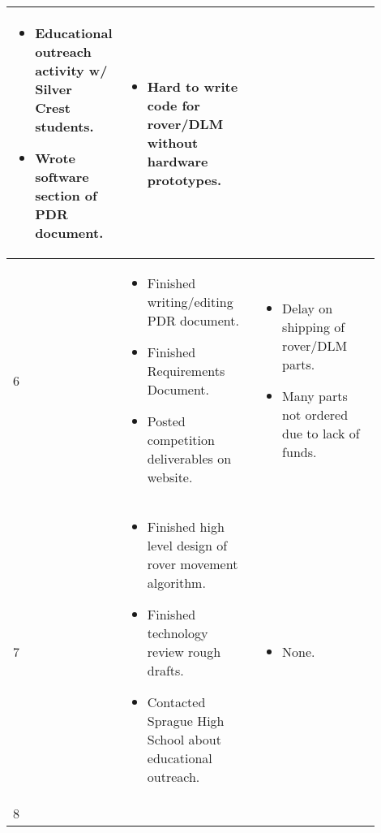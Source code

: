 \documentclass[onecolumn, draftclsnofoot,10pt, compsoc]{IEEEtran}
\newenvironment{myitemize}
{ \begin{itemize}
    \setlength{\itemsep}{0pt}
    \setlength{\parskip}{0pt}
    \setlength{\parsep}{0pt}     }
{ \end{itemize}                  }
\begin{document}
\begin{singlespacing}
\begin{tabular} {l p{0.45\linewidth} p{0.45\linewidth}}
\begin{myitemize}
\item Educational outreach activity w/ Silver Crest students.
\item Wrote software section of PDR document.
\vspace{-\baselineskip}\end{myitemize} & 
\vspace{-\baselineskip}\begin{myitemize}
\item Hard to write code for rover/DLM without hardware prototypes.
\vspace{-\baselineskip}\end{myitemize} \\\hline
6 &
\vspace{-\baselineskip}\begin{myitemize}
\item Finished writing/editing PDR document.
\item Finished Requirements Document.
\item Posted competition deliverables on website.
\vspace{-\baselineskip}\end{myitemize} & 
\vspace{-\baselineskip}\begin{myitemize}
\item Delay on shipping of rover/DLM parts.
\item Many parts not ordered due to lack of funds.
\vspace{-\baselineskip}\end{myitemize} \\\hline
7 &
\vspace{-\baselineskip}\begin{myitemize}
\item Finished high level design of rover movement algorithm.
\item Finished technology review rough drafts.
\item Contacted Sprague High School about educational outreach.
\vspace{-\baselineskip}\end{myitemize} & 
\vspace{-\baselineskip}\begin{myitemize}
\item None.
\vspace{-\baselineskip}\end{myitemize} \\\hline
8 &
\vspace{-\baselineskip}\begin{myitemize}

\end{myitemize}
\end{tabular}
\end{singlespacing}
\end{document}
